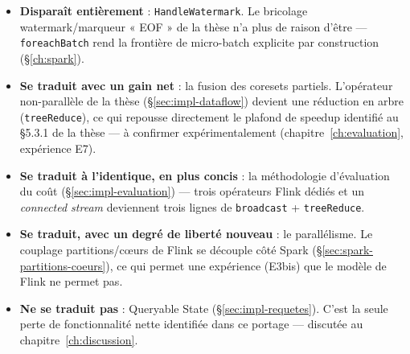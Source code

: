 \begin{itemize}
  \item \textbf{Disparaît entièrement} : \texttt{HandleWatermark}. Le
    bricolage watermark/marqueur « EOF » de la thèse n'a plus de raison
    d'être --- \texttt{foreachBatch} rend la frontière de micro-batch
    explicite par construction (§\ref{ch:spark}).
  \item \textbf{Se traduit avec un gain net} : la fusion des coresets
    partiels. L'opérateur non-parallèle de la thèse (\S\ref{sec:impl-dataflow})
    devient une réduction en arbre (\texttt{treeReduce}), ce qui repousse
    directement le plafond de speedup identifié au §5.3.1 de la thèse ---
    à confirmer expérimentalement (chapitre~\ref{ch:evaluation},
    expérience E7).
  \item \textbf{Se traduit à l'identique, en plus concis} : la méthodologie
    d'évaluation du coût (§\ref{sec:impl-evaluation}) --- trois opérateurs
    Flink dédiés et un \emph{connected stream} deviennent trois lignes de
    \texttt{broadcast} + \texttt{treeReduce}.
  \item \textbf{Se traduit, avec un degré de liberté nouveau} : le
    parallélisme. Le couplage partitions/c\oe{}urs de Flink se découple côté
    Spark (§\ref{sec:spark-partitions-coeurs}), ce qui permet une expérience
    (E3bis) que le modèle de Flink ne permet pas.
  \item \textbf{Ne se traduit pas} : Queryable State
    (§\ref{sec:impl-requetes}). C'est la seule perte de fonctionnalité nette
    identifiée dans ce portage --- discutée au chapitre~\ref{ch:discussion}.
\end{itemize}
